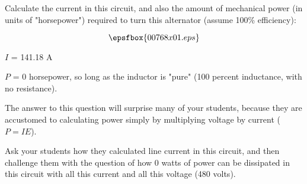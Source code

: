 

Calculate the current in this circuit, and also the amount of mechanical power (in units of "horsepower") required to turn this alternator (assume 100\% efficiency):

$$\epsfbox{00768x01.eps}$$







$I$ = 141.18 A

$P$ = 0 horsepower, so long as the inductor is "pure" (100 percent inductance, with no resistance).







The answer to this question will surprise many of your students, because they are accustomed to calculating power simply by multiplying voltage by current ($P = I E$).

Ask your students how they calculated line current in this circuit, and then challenge them with the question of how 0 watts of power can be dissipated in this circuit with all this current and all this voltage (480 volts).




